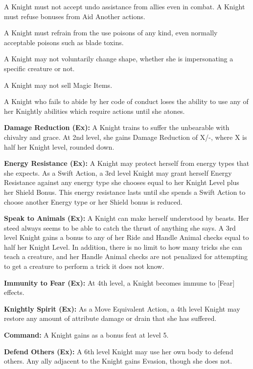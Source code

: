 \begin{itemize*}
\item A Knight must not accept undo assistance from allies even in combat. A Knight must refuse bonuses from Aid Another actions.
\item A Knight must refrain from the use poisons of any kind, even normally acceptable poisons such as blade toxins.
\item A Knight may not voluntarily change shape, whether she is impersonating a specific creature or not.
\item A Knight may not sell Magic Items.
\end{itemize*}

A Knight who fails to abide by her code of conduct loses the ability to use any of her Knightly abilities which require actions until she atones.

\textbf{Damage Reduction (Ex):} A Knight trains to suffer the unbearable with chivalry and grace. At 2nd level, she gains Damage Reduction of X/-, where X is half her Knight level, rounded down.

\textbf{Energy Resistance (Ex):} A Knight may protect herself from energy types that she expects. As a Swift Action, a 3rd level Knight may grant herself Energy Resistance against any energy type she chooses equal to her Knight Level plus her Shield Bonus. This energy resistance lasts until she spends a Swift Action to choose another Energy type or her Shield bonus is reduced.

\textbf{Speak to Animals (Ex):} A Knight can make herself understood by beasts. Her steed always seems to be able to catch the thrust of anything she says. A 3rd level Knight gains a bonus to any of her Ride and Handle Animal checks equal to half her Knight Level. In addition, there is no limit to how many tricks she can teach a creature, and her Handle Animal checks are not penalized for attempting to get a creature to perform a trick it does not know.

\textbf{Immunity to Fear (Ex):} At 4th level, a Knight becomes immune to [Fear] effects.

\textbf{Knightly Spirit (Ex):} As a Move Equivalent Action, a 4th level Knight may restore any amount of attribute damage or drain that she has suffered.

\textbf{Command:} A Knight gains  as a bonus feat at level 5.

\textbf{Defend Others (Ex):} A 6th level Knight may use her own body to defend others. Any ally adjacent to the Knight gains Evasion, though she does not.

